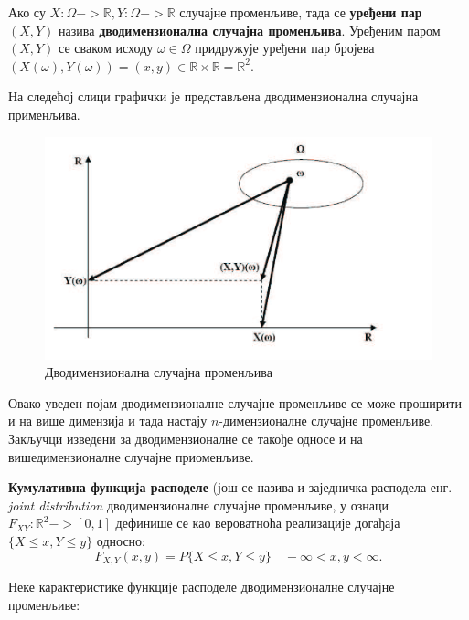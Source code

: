 \begin{de}
Ако су $X : \Omega -> \mathbb{R} , Y : \Omega -> \mathbb{R}$ случајне променљиве, тада се \textbf{уређени пар} $(X,Y)$ назива \textbf{дводимензионална случајна променљива}. Уређеним паром   $(X,Y)$ се  сваком исходу $\omega \in \Omega$ придружује уређени пар бројева $(X(\omega), Y(\omega))= (x,y) \in \mathbb{R} \times \mathbb{R} = \mathbb{R}^2$.
\end{de}

На следећој слици %
графички је представљена дводимензионална случајна применљива.



\begin{figure}[H]
    \centering
\captionsetup{justification=centering}
   \includegraphics[scale=0.8]{./Slike/slika16.png} 
	\caption{Дводимензионална случајна променљива} 
	\label{fig:slika13}
\end{figure}

Овако уведен појам дводимензионалне случајне променљиве се може проширити и на више димензија и тада настају $n$-димензионалне случајне променљиве. Закључци изведени за дводимензионалне се такође односе и на вишедимензионалне случајне приоменљиве.

\textbf{Кумулативна функција расподеле} (још се назива и заједничка расподела енг. \textit{joint distribution} дводимензионалне случајне променљиве, у ознаци $ F_{XY} : \mathbb{R}^2 -> [0,1] $ дефинише се као вероватноћа реализације догађаја $ \lbrace X \leq x , Y \leq y \rbrace $ односно:
$$
F_{X,Y}(x,y) = P \lbrace X \leq x, Y \leq y \rbrace \quad  - \infty < x,y < \infty.
$$

Неке карактеристике функције расподеле дводимензионалне случајне променљиве:

